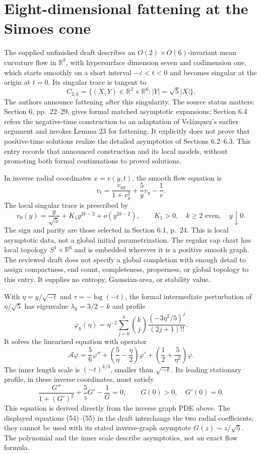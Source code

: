 \chapter{Eight-dimensional fattening at the Simoes cone}\label{sec:catalogue-aiv-eight-fattening}
\begin{example}\label{ex:catalogue-aiv-eight-fattening}
The supplied unfinished draft \cite{CatAIV2002} describes an $O(2)\times O(6)$-invariant mean curvature flow in $\mathbb R^8$, with hypersurface dimension seven and codimension one, which starts smoothly on a short interval $-\varepsilon<t<0$ and becomes singular at the origin at $t=0$. Its singular trace is tangent to
\[
 C_{2,6}=\{(X,Y)\in\mathbb R^2\times\mathbb R^6:|Y|=\sqrt5|X|\}.
\]
The authors announce fattening after this singularity. The source status matters: Section 6, pp.~22--29, gives formal matched asymptotic expansions; Section 6.4 refers the negative-time construction to an adaptation of Vel\'azquez's earlier argument and invokes Lemma 23 for fattening. It explicitly does not prove that positive-time solutions realize the detailed asymptotics of Sections 6.2--6.3. This entry records that announced construction and its local models, without promoting both formal continuations to proved solutions.

In inverse radial coordinates $x=v(y,t)$, the smooth flow equation is
\[
 v_t=\frac{v_{yy}}{1+v_y^2}+\frac5y v_y-\frac1v.
\]
The local singular trace is prescribed by
\[
 v_0(y)=\frac y{\sqrt5}+K_1y^{2k-2}+o(y^{2k-2}),
 \qquad K_1>0,\quad k\geq2\text{ even},\quad y\downarrow0.
\]
The sign and parity are those selected in Section 6.1, p.~24. This is local asymptotic data, not a global initial parametrization. The regular cap chart has local topology $S^1\times\mathbb R^6$ and is embedded wherever it is a positive smooth graph. The reviewed draft does not specify a global completion with enough detail to assign compactness, end count, completeness, properness, or global topology to this entry. It supplies no entropy, Gaussian-area, or stability value.

With $\eta=y/\sqrt{-t}$ and $\tau=-\log(-t)$, the formal intermediate perturbation of $\eta/\sqrt5$ has eigenvalue $\lambda_k=3/2-k$ and profile
\[
 \varphi_k(\eta)=\eta^{-2}\sum_{j=0}^k
 \binom{k}{j}\frac{(-3\eta^2/5)^j}{(2j+1)!!}.
\]
It solves the linearized equation with operator
\[
 \mathcal A\varphi=\frac56\varphi''+
 \left(\frac5\eta-\frac\eta2\right)\varphi'+
 \left(\frac12+\frac5{\eta^2}\right)\varphi.
\]
The inner length scale is $(-t)^{k/3}$, smaller than $\sqrt{-t}$. Its leading stationary profile, in these inverse coordinates, must satisfy
\[
 \frac{G''}{1+(G')^2}+\frac5zG'-\frac1G=0,
 \qquad G(0)>0,\quad G'(0)=0.
\]
This equation is derived directly from the inverse graph PDE above. The displayed equations (54)--(55) in the draft interchange the two radial coefficients; they cannot be used with its stated inverse-graph asymptote $G(z)\sim z/\sqrt5$. The polynomial and the inner scale describe asymptotics, not an exact flow formula.


\end{example}
